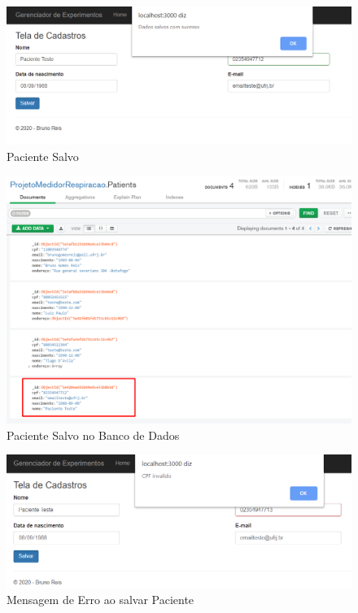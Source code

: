  \begin{figure}[h!]
 	\begin{center}
 		\includegraphics[width=0.8\linewidth]{images/paciente_salvo_tela.png}
 		\caption{Paciente Salvo}
 		\label{fig:paciente_salvo_tela}
 	\end{center}
 \end{figure}
 
 \begin{figure}[h!]
 	\begin{center}
 		\includegraphics[width=0.8\linewidth]{images/paciente_salvo_banco.png}
 		\caption{Paciente Salvo no Banco de Dados}
 		\label{fig:paciente_salvo_banco}
 	\end{center}
 \end{figure}
 
  \begin{figure}[h!]
 	\begin{center}
 		\includegraphics[width=0.8\linewidth]{images/cpf_invalido_msg.png}
 		\caption{Mensagem de Erro ao salvar Paciente}
 		\label{fig:cpf_invalido_msg}
 	\end{center}
 \end{figure}


